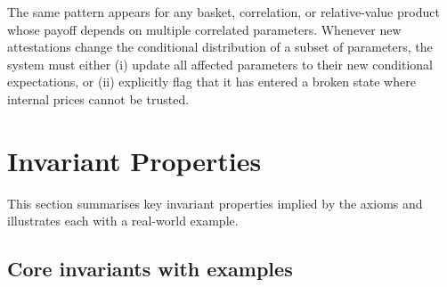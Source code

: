 \documentclass[11pt,a4paper]{article}
\begin{document}
The same pattern appears for any basket, correlation, or relative-value product whose payoff depends on multiple correlated parameters. Whenever new attestations change the conditional distribution of a subset of parameters, the system must either (i) update all affected parameters to their new conditional expectations, or (ii) explicitly flag that it has entered a broken state where internal prices cannot be trusted.

\section{Invariant Properties}

This section summarises key invariant properties implied by the axioms and illustrates each with a real-world example.

\subsection{Core invariants with examples}
\end{document}
